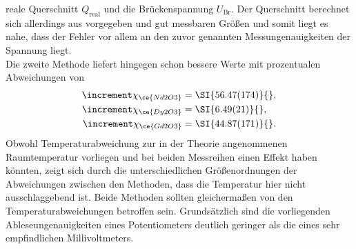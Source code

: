 reale Querschnitt $Q_{\text{real}}$ und die Brückenspannung $U_{\text{Br}}$. Der Querschnitt berechnet sich allerdings aus vorgegeben und gut messbaren Größen und somit liegt es nahe, dass der Fehler vor
allem an den zuvor genannten Messungenauigkeiten der Spannung liegt. 
\\
\newline
Die zweite Methode liefert hingegen schon bessere Werte mit prozentualen Abweichungen von
\begin{align*}
    \increment \chi_{\ce{Nd2O3}} &=\SI{56.47(174)}{}, \\  
    \increment \chi_{\ce{Dy2O3}} &=\SI{6.49(21)}{},\\ 
    \increment \chi_{\ce{Gd2O3}} &=\SI{44.87(171)}{}. 
 \end{align*}
Obwohl Temperaturabweichung zur in der Theorie angenommenen Raumtemperatur vorliegen und bei beiden Messreihen einen Effekt haben könnten, zeigt sich durch
die unterschiedlichen Größenordnungen der Abweichungen zwischen den Methoden, dass die Temperatur hier nicht ausschlaggebend ist. Beide Methoden sollten gleichermaßen von den Temperaturabweichungen betroffen sein.
Grundsätzlich sind die vorliegenden Ableseungenauigkeiten eines Potentiometers deutlich geringer als die eines sehr empfindlichen Millivoltmeters.